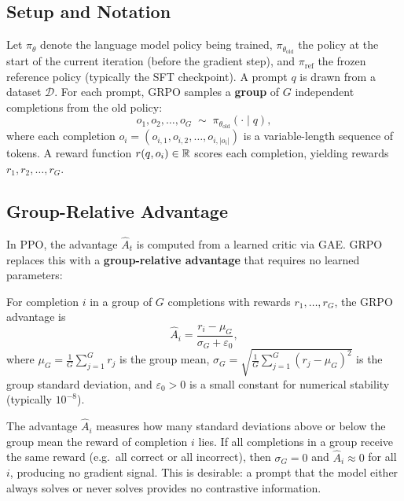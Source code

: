 \subsection{Setup and Notation}

Let $\pi_\theta$ denote the language model policy being trained, $\pi_{\theta_\mathrm{old}}$ the policy at the start of the current iteration (before the gradient step), and $\pi_\mathrm{ref}$ the frozen reference policy (typically the SFT checkpoint).  A prompt $q$ is drawn from a dataset $\mathcal{D}$.  For each prompt, GRPO samples a \textbf{group} of $G$ independent completions from the old policy:
\begin{equation}
\label{eq:grpo-sampling}
o_1, o_2, \ldots, o_G \;\sim\; \pi_{\theta_\mathrm{old}}(\cdot \mid q),
\end{equation}
where each completion $o_i = (o_{i,1}, o_{i,2}, \ldots, o_{i,|o_i|})$ is a variable-length sequence of tokens.  A reward function $r(q, o_i) \in \mathbb{R}$ scores each completion, yielding rewards $r_1, r_2, \ldots, r_G$.

\subsection{Group-Relative Advantage}

In PPO, the advantage $\hat{A}_t$ is computed from a learned critic via GAE.  GRPO replaces this with a \textbf{group-relative advantage} that requires no learned parameters:

\begin{definition}
\label{def:grpo-advantage}
For completion $i$ in a group of $G$ completions with rewards $r_1, \ldots, r_G$, the GRPO advantage is
\begin{equation}
\label{eq:grpo-advantage}
\hat{A}_i = \frac{r_i - \mu_G}{\sigma_G + \varepsilon_0},
\end{equation}
where $\mu_G = \frac{1}{G}\sum_{j=1}^G r_j$ is the group mean, $\sigma_G = \sqrt{\frac{1}{G}\sum_{j=1}^G (r_j - \mu_G)^2}$ is the group standard deviation, and $\varepsilon_0 > 0$ is a small constant for numerical stability (typically $10^{-8}$).
\end{definition}

The advantage $\hat{A}_i$ measures how many standard deviations above or below the group mean the reward of completion $i$ lies.  If all completions in a group receive the same reward (e.g.\ all correct or all incorrect), then $\sigma_G = 0$ and $\hat{A}_i \approx 0$ for all $i$, producing no gradient signal.  This is desirable: a prompt that the model either always solves or never solves provides no contrastive information.

